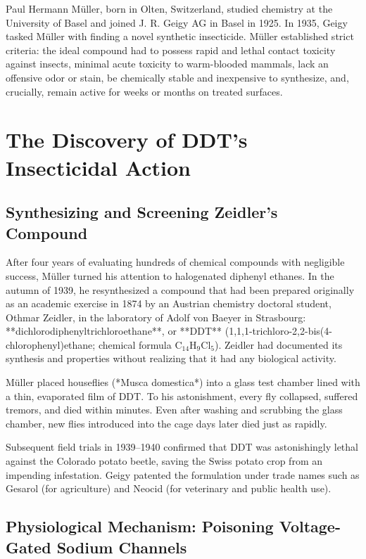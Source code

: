Paul Hermann Müller, born in Olten, Switzerland, studied chemistry at the University of Basel and joined J. R. Geigy AG in Basel in 1925. In 1935, Geigy tasked Müller with finding a novel synthetic insecticide. Müller established strict criteria: the ideal compound had to possess rapid and lethal contact toxicity against insects, minimal acute toxicity to warm-blooded mammals, lack an offensive odor or stain, be chemically stable and inexpensive to synthesize, and, crucially, remain active for weeks or months on treated surfaces.

\section{The Discovery of DDT's Insecticidal Action}

\subsection{Synthesizing and Screening Zeidler's Compound}

After four years of evaluating hundreds of chemical compounds with negligible success, Müller turned his attention to halogenated diphenyl ethanes. In the autumn of 1939, he resynthesized a compound that had been prepared originally as an academic exercise in 1874 by an Austrian chemistry doctoral student, Othmar Zeidler, in the laboratory of Adolf von Baeyer in Strasbourg: **dichlorodiphenyltrichloroethane**, or **DDT** (1,1,1-trichloro-2,2-bis(4-chlorophenyl)ethane; chemical formula $\text{C}_{14}\text{H}_9\text{Cl}_5$). Zeidler had documented its synthesis and properties without realizing that it had any biological activity.

Müller placed houseflies (*Musca domestica*) into a glass test chamber lined with a thin, evaporated film of DDT. To his astonishment, every fly collapsed, suffered tremors, and died within minutes. Even after washing and scrubbing the glass chamber, new flies introduced into the cage days later died just as rapidly. 

Subsequent field trials in 1939–1940 confirmed that DDT was astonishingly lethal against the Colorado potato beetle, saving the Swiss potato crop from an impending infestation. Geigy patented the formulation under trade names such as Gesarol (for agriculture) and Neocid (for veterinary and public health use).

\subsection{Physiological Mechanism: Poisoning Voltage-Gated Sodium Channels}

